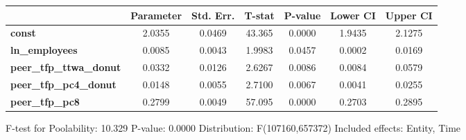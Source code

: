 \begin{center}
\begin{tabular}{lclc}
\bottomrule
\end{tabular}
\begin{tabular}{lcccccc}
                                & \textbf{Parameter} & \textbf{Std. Err.} & \textbf{T-stat} & \textbf{P-value} & \textbf{Lower CI} & \textbf{Upper CI}  \\
\midrule
\textbf{const}                  &       2.0355       &       0.0469       &      43.365     &      0.0000      &       1.9435      &       2.1275       \\
\textbf{ln\_employees}          &       0.0085       &       0.0043       &      1.9983     &      0.0457      &       0.0002      &       0.0169       \\
\textbf{peer\_tfp\_ttwa\_donut} &       0.0332       &       0.0126       &      2.6267     &      0.0086      &       0.0084      &       0.0579       \\
\textbf{peer\_tfp\_pc4\_donut}  &       0.0148       &       0.0055       &      2.7100     &      0.0067      &       0.0041      &       0.0255       \\
\textbf{peer\_tfp\_pc8}         &       0.2799       &       0.0049       &      57.095     &      0.0000      &       0.2703      &       0.2895       \\
\bottomrule
\end{tabular}
\end{center}

F-test for Poolability: 10.329 \newline
 P-value: 0.0000 \newline
 Distribution: F(107160,657372) \newline
  \newline
 Included effects: Entity, Time